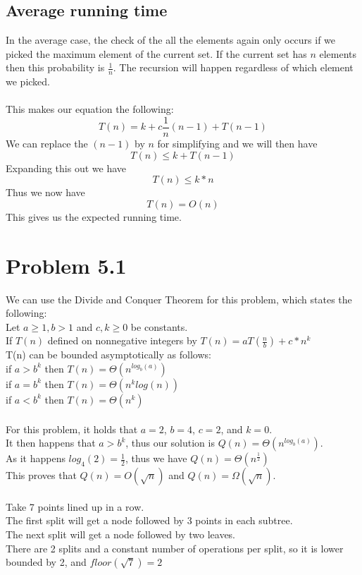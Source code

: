 \documentclass[11pt,psfig]{article}
\begin{document}
\subsection*{Average running time}

In the average case, the check of the all the elements again only occurs if we picked the maximum element of the current set. If the current set has $n$ elements then this probability is $\frac{1}{n}$. The recursion will happen regardless of which element we picked. \\
\\
This makes our equation the following:
\[
T(n) = k + c\frac{1}{n}(n-1) + T(n-1)
\]
We can replace the $(n-1)$ by $n$ for simplifying and we will then have
\[
T(n) \leq k + T(n-1)
\]
Expanding this out we have
\[
T(n) \leq k*n
\]
Thus we now have
\[
T(n) = O(n)
\]
This gives us the expected running time. 

\newpage

\section*{Problem 5.1}

We can use the Divide and Conquer Theorem for this problem, which states the following:\\
Let $a \geq 1, b>1$ and $c,k \geq 0$ be constants. \\
If $T(n)$ defined on nonnegative integers by $T(n) = a T(\frac{n}{b}) + c*n^k$\\
T(n) can be bounded asymptotically as follows:\\
if $a > b^k$ then $T(n) = \Theta( n^{log_b(a)} )$\\
if $a = b^k$ then $T(n) = \Theta( n^k log(n) )$\\
if $a < b^k$ then $T(n) = \Theta( n^k )$\\
\\
For this problem, it holds that $a=2$, $b=4$, $c=2$, and $k=0$. \\
It then happens that $a > b^k$, thus our solution is $Q(n) = \Theta( n^{log_b(a)} )$.\\
As it happens $log_4(2)=\frac{1}{2}$, thus we have $Q(n) = \Theta(n^{\frac{1}{2}})$\\
This proves that $Q(n)=O(\sqrt{n})$ and $Q(n)=\Omega(\sqrt{n})$.\\
\\
Take 7 points lined up in a row. \\
The first split will get a node followed by 3 points in each subtree. \\
The next split will get a node followed by two leaves. \\
There are 2 splits and a constant number of operations per split, so it is lower bounded by 2, and $floor(\sqrt{7}) = 2$
\end{document}
